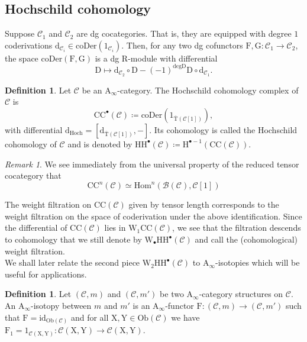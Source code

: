 \documentclass{article}
\theoremstyle{plain}
\theoremstyle{definition}
\newtheorem{definition}[theorem]{Definition}
\theoremstyle{remark}
\newtheorem{remark}[theorem]{Remark}
\newcommand{\mr}{\mathrm}
\newcommand{\Aa}{\mr{A}_{\infty}}
\newcommand{\Cc}{\mathcal C}
\newcommand{\3}{\vspace{3mm}}
\newcommand{\2}{\vspace{2mm}}
\newcommand{\1}{\vspace{1mm}}
\begin{document}
\subsection{Hochschild cohomology}

Suppose $\mathcal{C}_1$ and $\mathcal{C}_2$ are dg cocategories. That is, they are equipped with degree $1$ coderivations $\mr{d}_{\mathcal{C}_i}\in \mr{coDer}(1_{\mathcal{C}_i})$. Then, for any two dg cofunctors $\mr{F,G}:\mathcal{C}_1\to\mathcal{C}_2$, the space $\mr{coDer}(\mr{F,G})$ is a dg $\mr{R}$-module with differential $$\mr{D}\mapsto \mr{d}_{\mathcal{C}_2}\circ \mr{D}-(-1)^{\mr{deg}\mr{D}}\mr{D}\circ \mr{d}_{\mathcal{C}_1}.$$

\begin{definition}
Let $\mathcal{C}$ be an $\Aa$-category. The Hochschild cohomology complex of $\mathcal{C}$ is $$\mr{CC}^\bullet(\mathcal{C})\coloneqq \mr{coDer}\left(1_{\overline{\mr{T}}\left(\mathcal{C}[1]\right)}\right),$$ with differential $\mr{d}_\mr{Hoch}=[\mr{d}_{\overline{\mr{T}}\left(\mathcal{C}[1]\right)},-]$. Its cohomology is called the Hochschild cohomology of $\Cc$ and is denoted by $\mr{HH}^\bullet(\mathcal{C})\coloneqq \mr{H}^{\bullet-1}(\mr{CC}(\Cc))$.
\end{definition} 
\2
\begin{remark}
We see immediately from the universal property of the reduced tensor cocategory that $$\mr{CC}^{n}(\mathcal{C})\simeq \mr{Hom}^{n}\left(\mathcal{B}\left(\mathcal{C}\right),\mathcal{C}[1]\right)$$
\end{remark}
The weight filtration on $\mr{CC}(\mathcal{C})$ given by tensor length corresponds to the weight filtration on the space of coderivation under the above identification. Since the differential of $\mr{CC}(\mathcal{C})$ lies in $\mr{W}_1\mr{CC}(\mathcal{C})$, we see that the filtration descends to cohomology that we still denote by $\mr{W}_\bullet\mr{HH}^{\bullet}(\mathcal{C})$ and call the (cohomological) weight filtration.\\ We shall later relate the second piece $\mr{W}_2\mr{HH}^\bullet(\mathcal{C})$ to $\Aa$-isotopies which will be useful for applications.
\2
\begin{definition}
Let $(\mathcal{C},m)$ and $(\Cc,m')$ be two $\Aa$-category structures on $\Cc$. An $\Aa$-isotopy between $m$ and $m'$ is an $\Aa$-functor $\mr{F}:(\Cc,m)\to (\Cc,m')$ such that $\mr{F}=\mr{id}_{\mr{Ob}(\Cc)}$ and for all $\mr{X,Y}\in \mr{Ob}(\Cc)$ we have  $\mr{F}_1=1_{\Cc(\mr{X,Y})}:\Cc(\mr{X,Y})\to \Cc(\mr{X,Y})$.
\end{definition}
\end{document}
